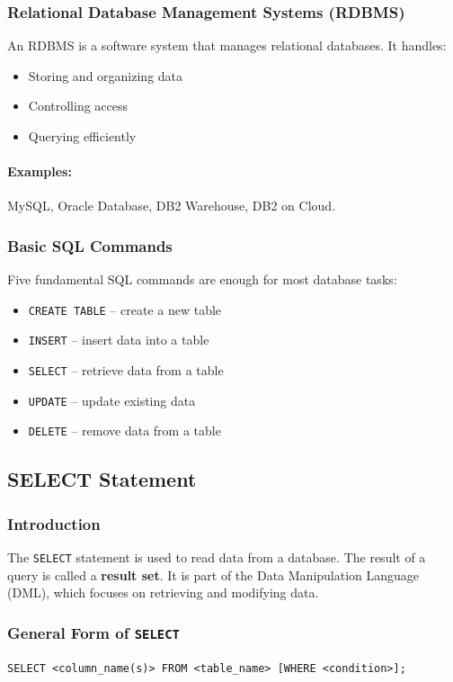 \documentclass{article}
\begin{document}
\subsubsection{Relational Database Management Systems (RDBMS)}
An RDBMS is a software system that manages relational databases. It handles:
\begin{itemize}
    \item Storing and organizing data
    \item Controlling access
    \item Querying efficiently
\end{itemize}

\paragraph{Examples:} MySQL, Oracle Database, DB2 Warehouse, DB2 on Cloud.

\subsubsection{Basic SQL Commands}
Five fundamental SQL commands are enough for most database tasks:
\begin{itemize}
    \item \texttt{CREATE TABLE} – create a new table
    \item \texttt{INSERT} – insert data into a table
    \item \texttt{SELECT} – retrieve data from a table
    \item \texttt{UPDATE} – update existing data
    \item \texttt{DELETE} – remove data from a table
\end{itemize}

\subsection{SELECT Statement}

\subsubsection{Introduction}
The \texttt{SELECT} statement is used to read data from a database.  
The result of a query is called a \textbf{result set}.  
It is part of the Data Manipulation Language (DML), which focuses on retrieving and modifying data.

\subsubsection{General Form of \texttt{SELECT}}
\begin{FormulaBox}
\texttt{SELECT <column\_name(s)> FROM <table\_name> [WHERE <condition>];}
\end{FormulaBox}
\end{document}
